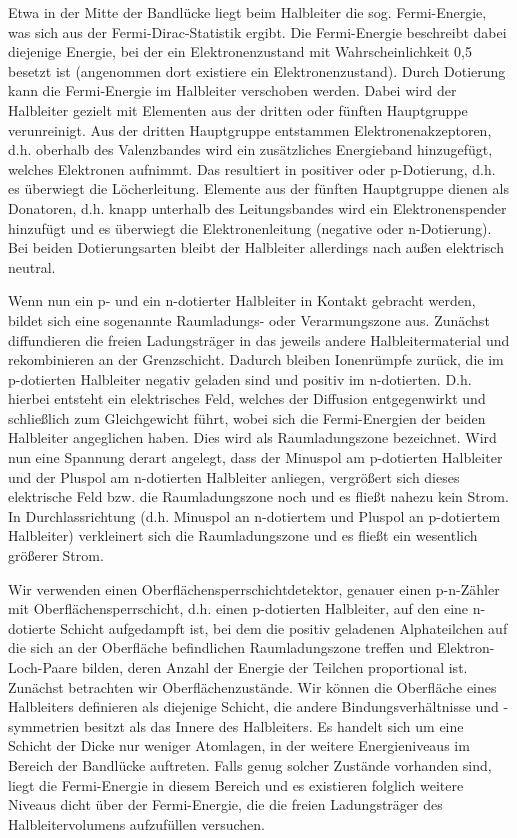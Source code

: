 \documentclass[bigchapter,colorback,accentcolor=tud4b,linedtoc,11pt]{tudreport}
\begin{document}
Etwa in der Mitte der Bandlücke liegt beim Halbleiter die sog. Fermi-Energie, was sich aus der Fermi-Dirac-Statistik ergibt. Die Fermi-Energie beschreibt dabei diejenige Energie, bei der ein Elektronenzustand mit Wahrscheinlichkeit 0,5 besetzt ist (angenommen dort existiere ein Elektronenzustand). Durch Dotierung kann die Fermi-Energie im Halbleiter verschoben werden. Dabei wird der Halbleiter gezielt mit Elementen aus der dritten oder fünften Hauptgruppe verunreinigt. Aus der dritten Hauptgruppe entstammen Elektronenakzeptoren, d.h. oberhalb des Valenzbandes wird ein zusätzliches Energieband hinzugefügt, welches Elektronen aufnimmt. Das resultiert in positiver oder p-Dotierung, d.h. es überwiegt die Löcherleitung. Elemente aus der fünften Hauptgruppe dienen als Donatoren, d.h. knapp unterhalb des Leitungsbandes wird ein Elektronenspender hinzufügt und es überwiegt die Elektronenleitung (negative oder n-Dotierung). Bei beiden Dotierungsarten bleibt der Halbleiter allerdings nach außen elektrisch neutral.
\color{black}

Wenn nun ein p- und ein n-dotierter Halbleiter in Kontakt gebracht werden, bildet sich eine sogenannte Raumladungs- oder Verarmungszone aus. Zunächst diffundieren die freien Ladungsträger in das jeweils andere Halbleitermaterial und rekombinieren an der Grenzschicht. Dadurch bleiben Ionenrümpfe zurück, die im p-dotierten Halbleiter negativ geladen sind und positiv im n-dotierten. D.h. hierbei entsteht ein elektrisches Feld, welches der Diffusion entgegenwirkt und schließlich zum Gleichgewicht führt, wobei sich die Fermi-Energien der beiden Halbleiter angeglichen haben. Dies wird als Raumladungszone bezeichnet. Wird nun eine Spannung derart angelegt, dass der Minuspol am p-dotierten Halbleiter und der Pluspol am n-dotierten Halbleiter anliegen, vergrößert sich dieses elektrische Feld bzw. die Raumladungszone noch und es fließt nahezu kein Strom. In Durchlassrichtung (d.h. Minuspol an n-dotiertem und Pluspol an p-dotiertem Halbleiter) verkleinert sich die Raumladungszone und es fließt ein wesentlich größerer Strom.

Wir verwenden einen Oberflächensperrschichtdetektor, genauer einen p-n-Zähler mit Oberflächensperrschicht, d.h. einen p-dotierten Halbleiter, auf den eine n-dotierte Schicht aufgedampft ist, bei dem die positiv geladenen Alphateilchen auf die sich an der Oberfläche befindlichen Raumladungszone treffen und Elektron-Loch-Paare bilden, deren Anzahl der Energie der Teilchen proportional ist. Zunächst betrachten wir Oberflächenzustände. Wir können die Oberfläche eines Halbleiters definieren als diejenige Schicht, die andere Bindungsverhältnisse und -symmetrien besitzt als das Innere des Halbleiters. Es handelt sich um eine Schicht der Dicke nur weniger Atomlagen, in der weitere Energieniveaus im Bereich der Bandlücke auftreten. Falls genug solcher Zustände vorhanden sind, liegt die Fermi-Energie in diesem Bereich und es existieren folglich weitere Niveaus dicht über der Fermi-Energie, die die freien Ladungsträger des Halbleitervolumens aufzufüllen versuchen. 
\end{document}
